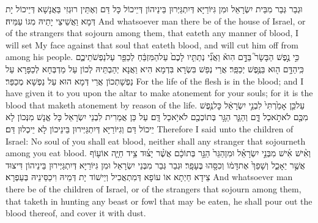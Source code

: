 {וּגְבַר גְּבַר מִבֵּית יִשְׂרָאֵל וּמִן גִּיּוֹרַיָּא דְּיִתְגַּיְּרוּן בֵּינֵיהוֹן דְּיֵיכוֹל כָּל דַּם וְאֶתֵּין רוּגְזִי בַּאֲנָשָׁא דְּיֵיכוֹל יָת דְּמָא וַאֲשֵׁיצֵי יָתֵיהּ מִגּוֹ עַמֵּיהּ׃}
{And whatsoever man there be of the house of Israel, or of the strangers that sojourn among them, that eateth any manner of blood, I will set My face against that soul that eateth blood, and will cut him off from among his people.}{}
{כִּ֣י נֶ֣פֶשׁ הַבָּשָׂר֮ בַּדָּ֣ם הִוא֒ וַאֲנִ֞י נְתַתִּ֤יו לָכֶם֙ עַל\maqqaf הַמִּזְבֵּ֔חַ לְכַפֵּ֖ר עַל\maqqaf נַפְשֹׁתֵיכֶ֑ם כִּֽי\maqqaf הַדָּ֥ם ה֖וּא בַּנֶּ֥פֶשׁ יְכַפֵּֽר׃}
{אֲרֵי נְפַשׁ בִּשְׂרָא בִּדְמָא הִיא וַאֲנָא יְהַבְתֵּיהּ לְכוֹן עַל מַדְבְּחָא לְכַפָּרָא עַל נַפְשָׁתְכוֹן אֲרֵי דְּמָא הוּא עַל נַפְשָׁא מְכַפַּר׃}
{For the life of the flesh is in the blood; and I have given it to you upon the altar to make atonement for your souls; for it is the blood that maketh atonement by reason of the life.}{}
{עַל\maqqaf כֵּ֤ן אָמַ֙רְתִּי֙ לִבְנֵ֣י יִשְׂרָאֵ֔ל כׇּל\maqqaf נֶ֥פֶשׁ מִכֶּ֖ם לֹא\maqqaf תֹ֣אכַל דָּ֑ם וְהַגֵּ֛ר הַגָּ֥ר בְּתוֹכְכֶ֖ם לֹא\maqqaf יֹ֥אכַל דָּֽם׃}
{עַל כֵּן אֲמַרִית לִבְנֵי יִשְׂרָאֵל כָּל אֱנָשׁ מִנְּכוֹן לָא יֵיכוֹל דַּם וְגִיּוֹרַיָּא דְּיִתְגַּיְּירוּן בֵּינֵיכוֹן לָא יֵיכְלוּן דַּם׃}
{Therefore I said unto the children of Israel: No soul of you shall eat blood, neither shall any stranger that sojourneth among you eat blood.}{}
{וְאִ֨ישׁ אִ֜ישׁ מִבְּנֵ֣י יִשְׂרָאֵ֗ל וּמִן\maqqaf הַגֵּר֙ הַגָּ֣ר בְּתוֹכָ֔ם אֲשֶׁ֨ר יָצ֜וּד צֵ֥יד חַיָּ֛ה אוֹ\maqqaf ע֖וֹף אֲשֶׁ֣ר יֵאָכֵ֑ל וְשָׁפַךְ֙ אֶת\maqqaf דָּמ֔וֹ וְכִסָּ֖הוּ בֶּעָפָֽר׃}
{וּגְבַר גְּבַר מִבְּנֵי יִשְׂרָאֵל וּמִן גִּיּוֹרַיָּא דְּיִתְגַּיְּירוּן בֵּינֵיהוֹן דִּיצוּד צֵידָא חַיְתָא אוֹ עוֹפָא דְּמִתְאֲכִיל וְיֵישׁוֹד יָת דְּמֵיהּ וִיכַסֵּינֵיהּ בְּעַפְרָא׃}
{And whatsoever man there be of the children of Israel, or of the strangers that sojourn among them, that taketh in hunting any beast or fowl that may be eaten, he shall pour out the blood thereof, and cover it with dust.}{}
